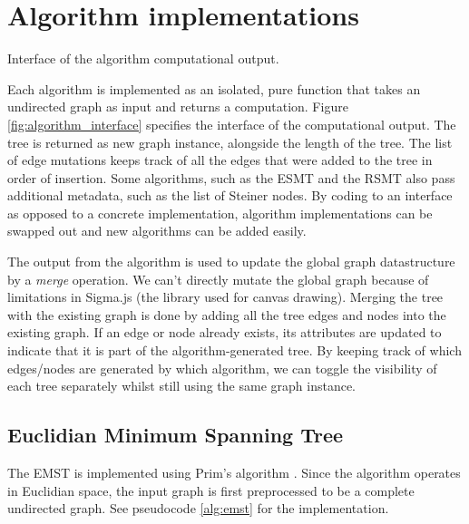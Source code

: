 \documentclass{l4proj}
\begin{document}
\section{Algorithm implementations}

\begin{wrapstuff}[r,width=0.3\textwidth,type=figure]
      \centering
      \caption{Interface of the algorithm computational output.}
      
      \label{fig:algorithm_interface}
\end{wrapstuff}
Each algorithm is implemented as an isolated, pure function that takes an undirected graph as input and returns a computation.
Figure \ref{fig:algorithm_interface} specifies the interface of the computational output. The tree is returned as new graph instance, alongside the length of the tree. The list of edge mutations keeps track of all the edges that were added to the tree in order of insertion. Some algorithms, such as the ESMT and the RSMT also pass additional metadata, such as the list of Steiner nodes.
By coding to an interface as opposed to a concrete implementation, algorithm implementations can be swapped out and new algorithms can be added easily.

The output from the algorithm is used to update the global graph datastructure by a \textit{merge} operation. We can't directly mutate the global graph because of limitations in Sigma.js (the library used for canvas drawing).
Merging the tree with the existing graph is done by adding all the tree edges and nodes into the existing graph. If an edge or node already exists, its attributes are updated to indicate that it is part of the algorithm-generated tree. By keeping track of which edges/nodes are generated by which algorithm, we can toggle the visibility of each tree separately whilst still using the same graph instance.

\wrapstuffclear
\subsection{Euclidian Minimum Spanning Tree}
The EMST is implemented using Prim's algorithm \citep[pp. 194--195]{Skiena2008}. Since the algorithm operates in Euclidian space, the input graph is first preprocessed to be a complete undirected graph. See pseudocode \ref{alg:emst} for the implementation.
\end{document}
